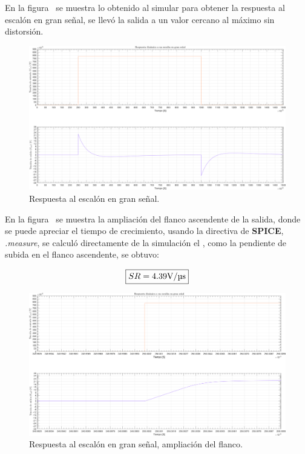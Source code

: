 En la figura~ se muestra lo obtenido al simular para obtener la respuesta al escalón en gran señal, se llevó la salida a un valor cercano al máximo sin distorsión.

\begin{figure}[H] %
\begin{center}
\includegraphics[width=0.9 \textwidth, angle=90]{./img/puntos/P11f_I_step_big_signal.png}
\caption{\label{fig:fig_step_big_signal}\footnotesize{Respuesta al escalón en gran señal.}}
\end{center}
\end{figure}


En la figura~ se muestra la ampliación del flanco ascendente de la salida, donde se puede apreciar el tiempo de crecimiento, usando la directiva de \textbf{SPICE}, \textit{.measure}, se calculó directamente de la simulación el \textbf{}, como la pendiente de subida en el flanco ascendente, se obtuvo:


\begin{equation}
\boxed{SR = 4.39 \si[per-mode=symbol]{\volt\per\micro\second}}
\end{equation}



\begin{figure}[H] %
\begin{center}
\includegraphics[width=0.9 \textwidth, angle=90]{./img/puntos/P11f_I_step_big_signal_zoom.png}
\caption{\label{fig:fig_step_big_signal_zoom}\footnotesize{Respuesta al escalón en gran señal, ampliación del flanco.}}
\end{center}
\end{figure}

